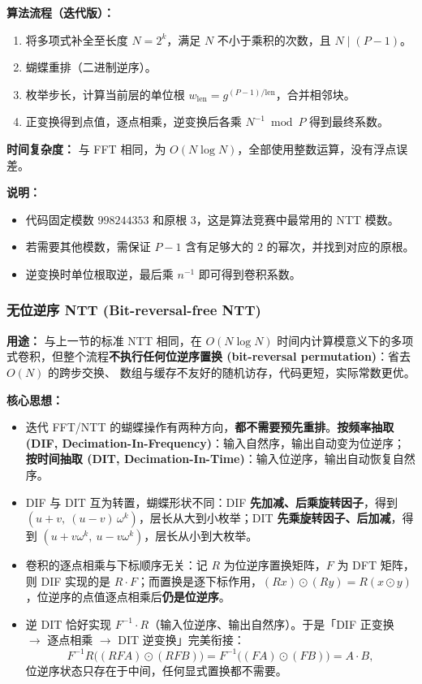\vspace{0.3cm}

\textbf{算法流程（迭代版）：}
\begin{enumerate}
    \item 将多项式补全至长度 $N=2^k$，满足 $N$ 不小于乘积的次数，且 $N \mid (P-1)$。
    \item 蝴蝶重排（二进制逆序）。
    \item 枚举步长，计算当前层的单位根 $w_{\text{len}}=g^{(P-1)/\text{len}}$，合并相邻块。
    \item 正变换得到点值，逐点相乘，逆变换后各乘 $N^{-1}\bmod P$ 得到最终系数。
\end{enumerate}

\textbf{时间复杂度：} 与 FFT 相同，为 $O(N\log N)$，全部使用整数运算，没有浮点误差。



\textbf{说明：}
\begin{itemize}
    \item 代码固定模数 $998244353$ 和原根 $3$，这是算法竞赛中最常用的 NTT 模数。
    \item 若需要其他模数，需保证 $P-1$ 含有足够大的 $2$ 的幂次，并找到对应的原根。
    \item 逆变换时单位根取逆，最后乘 $n^{-1}$ 即可得到卷积系数。
\end{itemize}

\subsubsection{无位逆序 NTT (Bit-reversal-free NTT)}

\textbf{用途：}  
与上一节的标准 NTT 相同，在 $O(N\log N)$ 时间内计算模意义下的多项式卷积，但整个流程\textbf{不执行任何位逆序置换 (bit-reversal permutation)}：省去 $O(N)$ 的跨步交换、 数组与缓存不友好的随机访存，代码更短，实际常数更优。

\textbf{核心思想：}
\begin{itemize}
    \item 迭代 FFT/NTT 的蝴蝶操作有两种方向，\textbf{都不需要预先重排}。\textbf{按频率抽取 (DIF, Decimation-In-Frequency)}：输入自然序，输出自动变为位逆序；\textbf{按时间抽取 (DIT, Decimation-In-Time)}：输入位逆序，输出自动恢复自然序。
    \item DIF 与 DIT 互为转置，蝴蝶形状不同：DIF \textbf{先加减、后乘旋转因子}，得到 $(u+v,\ (u-v)\,\omega^{k})$，层长从大到小枚举；DIT \textbf{先乘旋转因子、后加减}，得到 $(u+v\omega^{k},\ u-v\omega^{k})$，层长从小到大枚举。
    \item 卷积的逐点相乘与下标顺序无关：记 $R$ 为位逆序置换矩阵，$F$ 为 DFT 矩阵，则 DIF 实现的是 $R\cdot F$；而置换是逐下标作用，$(Rx)\odot(Ry)=R(x\odot y)$，位逆序的点值逐点相乘后\textbf{仍是位逆序}。
    \item 逆 DIT 恰好实现 $F^{-1}\cdot R$（输入位逆序、输出自然序）。于是「DIF 正变换 $\to$ 逐点相乘 $\to$ DIT 逆变换」完美衔接：\[F^{-1}R\big((RFA)\odot(RFB)\big)=F^{-1}\big((FA)\odot(FB)\big)=A\cdot B,\] 位逆序状态只存在于中间，任何显式置换都不需要。
\end{itemize}

